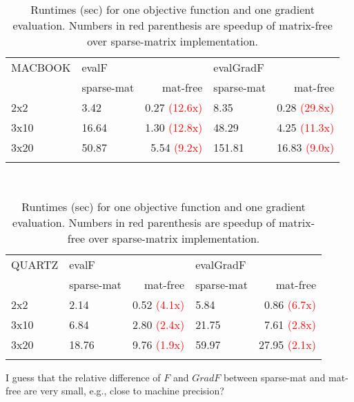 \documentclass[letterpaper]{article}
\newcommand{\YC}[1]{{\textcolor{Bronze}{#1}}}
\begin{document}
\begin{table}[h]
  \begin{tabular}{l|lr|lr}
    \hline\noalign{\smallskip}
     MACBOOK    & evalF &    &  evalGradF &\\
                & sparse-mat & mat-free & sparse-mat& mat-free  \\
    \noalign{\smallskip}\hline\noalign{\smallskip}
    2x2  & 3.42   & 0.27 \textcolor{red}{(12.6x)}  & 8.35  &  0.28 \textcolor{red}{(29.8x)}  \\
    3x10 & 16.64  & 1.30  \textcolor{red}{(12.8x)} & 48.29 &  4.25 \textcolor{red}{(11.3x)}  \\
    3x20 &  50.87 & 5.54  \textcolor{red}{(9.2x)}  & 151.81 & 16.83 \textcolor{red}{ (9.0x)} \\
    \noalign{\smallskip}\hline
  \end{tabular}\\[2ex]
  \begin{tabular}{l|lr|lr}
    \hline\noalign{\smallskip}
     QUARTZ  & evalF &    &  evalGradF & \\
            & sparse-mat & mat-free & sparse-mat& mat-free  \\
    \noalign{\smallskip}\hline\noalign{\smallskip}
    2x2  &  2.14 & 0.52  \textcolor{red}{ (4.1x)} &  5.84 & 0.86 \textcolor{red}{ (6.7x)}  \\
    3x10 &  6.84 & 2.80  \textcolor{red}{ (2.4x)} & 21.75 & 7.61 \textcolor{red}{(2.8x)}   \\
    3x20 & 18.76 & 9.76  \textcolor{red}{(1.9x)}  & 59.97 & 27.95 \textcolor{red}{(2.1x)}  \\
    \noalign{\smallskip}\hline
  \end{tabular}
  \caption{Runtimes (sec) for one objective function and one gradient
  evaluation. Numbers in red parenthesis are speedup of matrix-free over
  sparse-matrix implementation.}
  \label{tab:runtime_qvsm} 
\end{table}
\YC{I guess that the relative difference of $F$ and $GradF$ between sparse-mat
and mat-free are very small, e.g., close to machine precision?}

\end{document}
